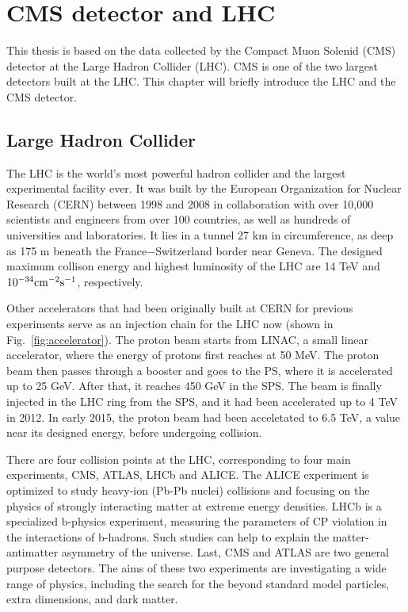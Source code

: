\chapter{CMS detector and LHC}
This thesis is based on the data collected by the Compact Muon Solenid (CMS) detector at the Large Hadron Collider (LHC). CMS is one of the two largest detectors built at the LHC. This chapter will briefly introduce the LHC and the CMS detector.

\section{Large Hadron Collider}
The LHC is the world's most powerful hadron collider and the largest experimental facility ever. It was built by the European Organization for Nuclear Research (CERN) between 1998 and 2008 in collaboration with over 10,000 scientists and engineers from over 100 countries, as well as hundreds of universities and laboratories. It lies in a tunnel 27 km in circumference, as deep as 175 m beneath the France$-$Switzerland border near Geneva. The designed maximum collison energy and highest luminosity of the LHC are 14 TeV and $\textup{10}^{-34} \textup{cm}^{-2}\textup{s}^{-1}$, respectively.

Other accelerators that had been originally built at CERN for previous experiments serve as an injection chain for the LHC now (shown in Fig.~\ref{fig:accelerator}). The proton beam starts from LINAC, a small linear accelerator, where the energy of protons first reaches at 50 MeV. The proton beam then passes through a booster and goes to the PS, where it is accelerated up to 25 GeV. After that, it reaches 450 GeV in the SPS. The beam is finally injected in the LHC ring from the SPS, and it had been accelerated up to 4 TeV in 2012. In early 2015, the proton beam had been acceletated to 6.5 TeV, a value near its designed energy, before undergoing collision.

There are four collision points at the LHC, corresponding to four main experiments, CMS, ATLAS, LHCb and ALICE. The ALICE experiment is optimized to study heavy-ion (Pb-Pb nuclei) collisions and focusing on the physics of strongly interacting matter at extreme energy densities. LHCb is a specialized b-physics experiment, measuring the parameters of CP violation in the interactions of b-hadrons. Such studies can help to explain the matter-antimatter asymmetry of the universe. Last, CMS and ATLAS are two general purpose detectors. The aims of these two experiments are investigating a wide range of physics, including the search for the beyond standard model particles, extra dimensions, and dark matter.


